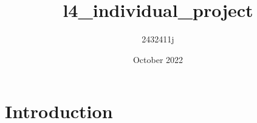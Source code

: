 \documentclass{article}
\title{l4_individual_project}
\author{2432411j }
\date{October 2022}
\begin{document}
\maketitle

\section{Introduction}
\end{document}
